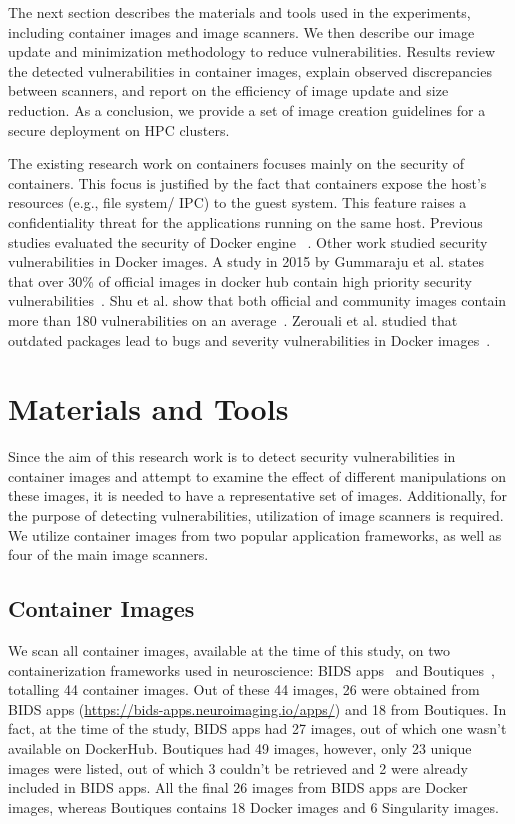 \documentclass[a4paper,num-refs]{oup-contemporary}
\begin{document}
The next section describes the materials and tools used in the experiments,
including container images and image scanners. We then describe our image
update and minimization methodology to reduce vulnerabilities. Results review
the detected vulnerabilities in container images, explain observed
discrepancies between scanners, and report on the efficiency of image
update and size reduction. As a conclusion, we provide a set of image
creation guidelines for a secure deployment on HPC clusters.

The existing research work on containers focuses mainly on the security of containers.
This focus is justified by the fact that containers expose the host's resources
(e.g., file system/ IPC) to the guest system. This feature raises a confidentiality
threat for the applications running on the same host. Previous studies evaluated
the security of Docker engine ~\cite{martin2018docker, sultan2019container, combe2016docker, bui2015analysis}.
Other work studied security vulnerabilities in Docker images. A study in 2015 by Gummaraju et al.
states that over 30\% of official images in docker hub contain high priority 
security vulnerabilities~\cite{gummaraju2015over}. Shu et al. show that both official and community images 
contain more than 180 vulnerabilities on an average~\cite{Shu2017}.
Zerouali et al. studied that 
outdated packages lead to bugs and severity vulnerabilities in Docker
images~\cite{zerouali2019relation}.

\section{Materials and Tools}

Since the aim of this research work is to detect security vulnerabilities
in container images and attempt to examine the effect of different
manipulations on these images, it is needed to have a representative set of
images. Additionally, for the purpose of detecting vulnerabilities,
utilization of image scanners is required. We utilize container
images from two popular application frameworks, as well as
four of the main image scanners.

\subsection{Container Images}

We scan all container images, available at the time of this study, on two containerization frameworks
used in neuroscience: BIDS
apps~\cite{gorgolewski2017bids} and Boutiques~\cite{glatard2018boutiques}, totalling
44 container images.
Out of these 44 images, 26 were obtained from BIDS apps
(\url{https://bids-apps.neuroimaging.io/apps/}) 
and 18 from Boutiques. In fact, at the time of the study, BIDS apps had 27 images,
out of which one wasn't available on DockerHub. Boutiques had 49 images,
however, only 23 unique images were listed, out of which 3 couldn't be retrieved and 2
were already included in BIDS apps. All the final 26 images
from BIDS apps are Docker images, whereas Boutiques contains 18 Docker images
and 6 Singularity images.
\end{document}
